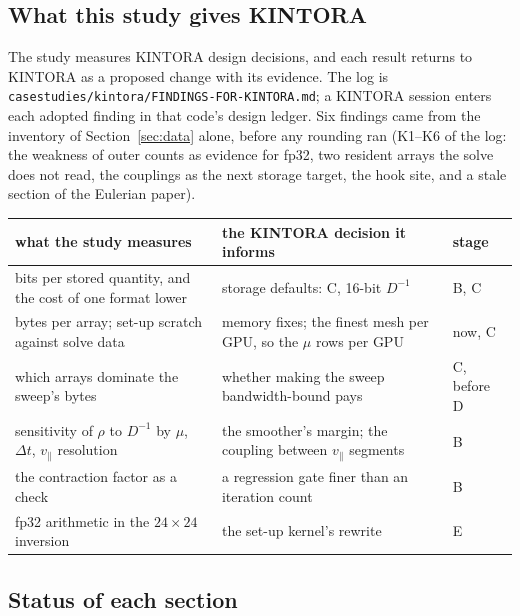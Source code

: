 \documentclass[11pt]{article}
\newcommand{\vpar}{v_\parallel}
\newcommand{\code}[1]{\texttt{#1}}
\begin{document}
\subsection{What this study gives KINTORA}

The study measures KINTORA design decisions, and each result returns to KINTORA as a proposed
change with its evidence.  The log is \code{casestudies/kintora/FINDINGS-FOR-KINTORA.md}; a
KINTORA session enters each adopted finding in that code's design ledger.  Six findings came from
the inventory of Section~\ref{sec:data} alone, before any rounding ran (K1--K6 of the log: the
weakness of outer counts as evidence for fp32, two resident arrays the solve does not read, the
couplings as the next storage target, the hook site, and a stale section of the Eulerian
paper).

\begin{center}
\footnotesize
\begin{tabularx}{\linewidth}{@{}>{\raggedright}X>{\raggedright}X>{\raggedright\arraybackslash}p{1.8cm}@{}}
\toprule
what the study measures & the KINTORA decision it informs & stage \\
\midrule
bits per stored quantity, and the cost of one format lower & storage defaults: C, 16-bit $D^{-1}$ & B, C \\
bytes per array; set-up scratch against solve data & memory fixes; the finest mesh per GPU, so the $\mu$ rows per GPU & now, C \\
which arrays dominate the sweep's bytes & whether making the sweep bandwidth-bound pays & C, before D \\
sensitivity of $\rho$ to $D^{-1}$ by $\mu$, $\Delta t$, $\vpar$ resolution & the smoother's margin; the coupling between $\vpar$ segments & B \\
the contraction factor as a check & a regression gate finer than an iteration count & B \\
fp32 arithmetic in the $24 \times 24$ inversion & the set-up kernel's rewrite & E \\
\bottomrule
\end{tabularx}
\end{center}

\subsection{Status of each section}
\end{document}
